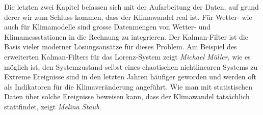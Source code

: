 Die letzten zwei Kapitel befassen sich mit der Aufarbeitung der
Daten, auf grund derer wir zum Schluss kommen, dass 
der Klimawandel real ist.
Für Wetter- wie auch für Klimamodelle sind grosse Datenmengen
von Wetter- und Klimamessstationen in die Rechnung zu integrieren.
Der Kalman-Filter ist die Basis vieler moderner Lösungsansätze
für dieses Problem.
Am Beispiel des erweiterten Kalman-Filters für das Lorenz-System
zeigt {\em Michael Müller}, wie es möglich ist, den Systemzustand
selbst eines chaotischen nichtlinearen Systems zu 
Extreme Ereignisse sind in den letzten Jahren häufiger geworden
und werden oft als Indikatoren für die Klimaveränderung angeführt.
Wie man mit statistischen Daten über solche Ereignisse beweisen
kann, dass der Klimawandel tatsächlich stattfindet, zeigt
{\em Melina Staub}.






